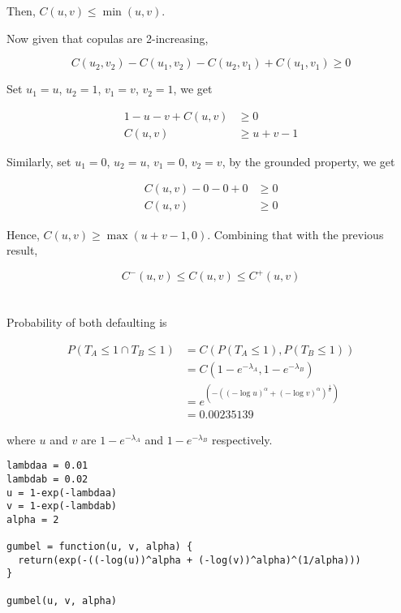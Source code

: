\documentclass[11pt]{scrartcl}
\begin{document}
Then, $C(u,v) \leq \min(u, v)$.

Now given that copulas are 2-increasing,

\[C(u_2, v_2) - C(u_1, v_2) - C(u_2, v_1) + C(u_1, v_1) \geq 0\]

Set $u_1 = u$, $u_2 = 1$, $v_1 = v$, $v_2 = 1$, we get

\begin{align*}
1 - u - v + C(u,v) &\geq 0 \\
C(u,v) &\geq u+v-1
\end{align*}

Similarly, set $u_1 = 0$, $u_2 = u$, $v_1 = 0$, $v_2 = v$, by the grounded property, we get

\begin{align*}
C(u,v) - 0 - 0 + 0 &\geq 0 \\
C(u,v) &\geq 0
\end{align*}

Hence, $C(u,v) \geq \max(u+v-1, 0)$. Combining that with the previous result,

\[C^-(u,v) \leq C(u,v) \leq C^+(u, v)\]

\section{}

\subsection{}

Probability of both defaulting is

\begin{align*}
P(T_A \leq 1 \cap T_B \leq 1) &= C(P(T_A \leq 1), P(T_B \leq 1)) \\
&= C(1-e^{-\lambda_A}, 1-e^{-\lambda_B}) \\
&= e^{\left( -((-\log{u})^{\alpha} + (-\log{v})^{\alpha})^{\frac{1}{\alpha}}\right)} \\
&= 0.00235139
\end{align*}

where $u$ and $v$ are $1- e^{-\lambda_A}$ and $1-e^{-\lambda_B}$ respectively.

\begin{lstlisting}
lambdaa = 0.01
lambdab = 0.02
u = 1-exp(-lambdaa)
v = 1-exp(-lambdab)
alpha = 2

gumbel = function(u, v, alpha) {
  return(exp(-((-log(u))^alpha + (-log(v))^alpha)^(1/alpha)))
}

gumbel(u, v, alpha)
\end{lstlisting}
\end{document}
